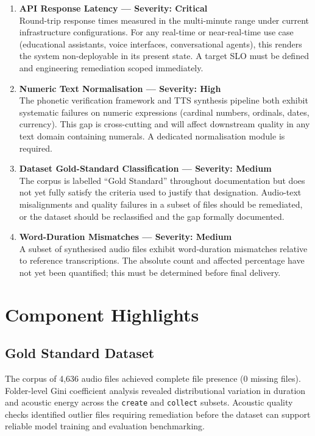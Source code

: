 \documentclass[12pt, a4paper]{article}
\newcommand{\risk}[1]{\textcolor{status-fail}{\textbf{#1}}}
\newcommand{\caution}[1]{\textcolor{status-warn}{\textbf{#1}}}
\begin{document}
\begin{enumerate}[label=\textbf{R\arabic*.}, leftmargin=2.5em, itemsep=0.4em]

  \item \textbf{\risk{API Response Latency — Severity: Critical}} \\
  Round-trip response times measured in the multi-minute range under current infrastructure configurations. For any real-time or near-real-time use case (educational assistants, voice interfaces, conversational agents), this renders the system non-deployable in its present state. A target SLO must be defined and engineering remediation scoped immediately.

  \item \textbf{\caution{Numeric Text Normalisation — Severity: High}} \\
  The phonetic verification framework and TTS synthesis pipeline both exhibit systematic failures on numeric expressions (cardinal numbers, ordinals, dates, currency). This gap is cross-cutting and will affect downstream quality in any text domain containing numerals. A dedicated normalisation module is required.

  \item \textbf{\caution{Dataset Gold-Standard Classification — Severity: Medium}} \\
  The corpus is labelled ``Gold Standard'' throughout documentation but does not yet fully satisfy the criteria used to justify that designation. Audio-text misalignments and quality failures in a subset of files should be remediated, or the dataset should be reclassified and the gap formally documented.

  \item \textbf{\caution{Word-Duration Mismatches — Severity: Medium}} \\
  A subset of synthesised audio files exhibit word-duration mismatches relative to reference transcriptions. The absolute count and affected percentage have not yet been quantified; this must be determined before final delivery.

\end{enumerate}

\section{Component Highlights}

\subsection{Gold Standard Dataset}
The corpus of 4,636 audio files achieved complete file presence (0 missing files). Folder-level Gini coefficient analysis revealed distributional variation in duration and acoustic energy across the \texttt{create} and \texttt{collect} subsets. Acoustic quality checks identified outlier files requiring remediation before the dataset can support reliable model training and evaluation benchmarking.
\end{document}
